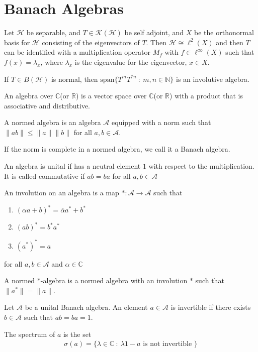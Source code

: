 
\chapter{Banach Algebras}

Let $\mathcal{H}$ be separable, and  $T \in \mathcal{K}(\mathcal{H})$
be self adjoint, and $X$ be the
orthonormal basis for $\mathcal{H}$ consisting of the eigenvectors of
$T$. Then $\mathcal{H} \cong \ell^{2}(X)$ and then $T$ can be
identified with a multiplication operator $M_f$ with $f \in
\ell^{\infty}(X)$ such that $f(x) = \lambda_x$, where $\lambda_x$ is
the eigenvalue for the eigenvector, $x \in X$.

If $T \in B(\mathcal{H})$ is normal, then $\textrm{span}\{ T^mT^{*n}
\ : \   m, n \in \mathbb{N} \}$ is an involutive algebra.

\begin{definition}
  An algebra over $\mathbb{C}$(or $\mathbb{R}$) is a vector space
  over $\mathbb{C}$(or $\mathbb{R}$) with a product that is
  associative and distributive.

  A normed algebra is an algebra $\mathcal{A}$ equipped with a norm
  such that $\|ab\| \le \|a\|\|b\|$ for all $a, b \in \mathcal{A}$.

  If the norm is complete in a normed algebra, we call it a Banach algebra.

  An algebra is unital if has a neutral element $1$ with respect to
  the multiplication. It is called commutative if $ab = ba$ for all
  $a, b \in \mathcal{A}$

  An involution on an algebra is a map $*: \mathcal{A} \to
  \mathcal{A}$ such that
  \begin{enumerate}[label=(\arabic*)]
    \item $(\alpha a + b)^* = \overline{\alpha} a^* + b^*$
    \item $(ab)^* = b^*a^*$
    \item $(a^*)^* = a$
  \end{enumerate}
  for all $a, b \in \mathcal{A}$ and $\alpha \in \mathbb{C}$

  A normed $*$-algebra is a normed algebra with an involution $*$
  such that $\|a^*\| = \|a\|$.
\end{definition}

\begin{definition}
  Let $\mathcal{A}$ be a  unital Banach algebra. An element $a \in
  \mathcal{A}$ is invertible if there exists $b \in \mathcal{A}$ such
  that $ab = ba = 1$.

  The spectrum of $a$ is the set
  \begin{align*}
    \sigma(a) = \{ \lambda \in \mathbb{C}  \ : \  \lambda 1 - a
    \textrm{ is not invertible } \}
  \end{align*}
\end{definition}

